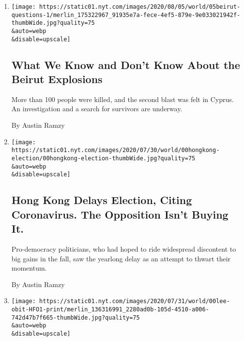 \begin{enumerate}
\def\labelenumi{\arabic{enumi}.}
\item
  \href{/2020/08/05/world/middleeast/beirut-explosion-what-happened.html}{}

  \texttt{[image: https://static01.nyt.com/images/2020/08/05/world/05beirut-questions-1/merlin\_175322967\_91935e7a-fece-4ef5-879e-9e033021942f-thumbWide.jpg?quality=75\\\&auto=webp\\\&disable=upscale]}

  \hypertarget{what-we-know-and-dont-know-about-the-beirut-explosions}{%
  \subsection{What We Know and Don't Know About the Beirut
  Explosions}\label{what-we-know-and-dont-know-about-the-beirut-explosions}}

  More than 100 people were killed, and the second blast was felt in
  Cyprus. An investigation and a search for survivors are underway.

  By Austin Ramzy
\item
  \href{/2020/07/31/world/asia/hong-kong-election-delayed.html}{}

  \texttt{[image: https://static01.nyt.com/images/2020/07/30/world/00hongkong-election/00hongkong-election-thumbWide.jpg?quality=75\\\&auto=webp\\\&disable=upscale]}

  \hypertarget{hong-kong-delays-election-citing-coronavirus-the-opposition-isnt-buying-it}{%
  \subsection{Hong Kong Delays Election, Citing Coronavirus. The
  Opposition Isn't Buying
  It.}\label{hong-kong-delays-election-citing-coronavirus-the-opposition-isnt-buying-it}}

  Pro-democracy politicians, who had hoped to ride widespread discontent
  to big gains in the fall, saw the yearlong delay as an attempt to
  thwart their momentum.

  By Austin Ramzy
\item
  \href{/2020/07/30/world/asia/lee-teng-hui-dead.html}{}

  \texttt{[image: https://static01.nyt.com/images/2020/07/31/world/00lee-obit-HFO1-print/merlin\_136316991\_2280ad0b-105d-4510-a006-742d47b7f665-thumbWide.jpg?quality=75\\\&auto=webp\\\&disable=upscale]}

  \hypertarget{lee-teng-hui-97-who-led-taiwans-turn-to-democracy-dies}{%
}
\end{enumerate}
